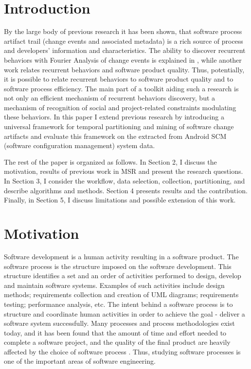 \documentclass[conference]{IEEEtran}
\begin{document}
\section{Introduction}
By the large body of previous research it has been shown, that software
process artifact trail (change events and associated metadata) is a rich 
source of process and developers' information and characteristics. 
The ability to discover recurrent behaviors with Fourier Analysis 
of change events is explained in \cite{citeulike:10377345}, while another work
\cite{citeulike:10392277} relates recurrent behaviors and software product quality.
Thus, potentially, it is possible to relate recurrent behaviors to software product 
quality and to software process efficiency. 
The main part of a toolkit aiding such a research is not only an efficient 
mechanism of recurrent behaviors discovery, but a mechanism of recognition of 
social and project-related constraints modulating these behaviors.
In this paper I extend previous research by introducing a universal 
framework for temporal partitioning and mining of software change 
artifacts and evaluate this framework on the extracted from Android 
SCM (software configuration management) system data. 

The rest of the paper is organized as follows. 
In Section 2, I discuss the motivation, results of previous work in MSR and present 
the research questions. 
In Section 3, I consider the workflow, data selection, collection, partitioning, 
and describe algorithms and methods. Section 4 presents results and the contribution.
Finally, in Section 5, I discuss limitations and possible extension of this work.

\section{Motivation}
Software development is a human activity resulting in a software product. 
The software process is the structure imposed on the software development. 
This structure identifies a set and an order of activities performed to design, 
develop and maintain software systems. Examples of such activities 
include design methods; requirements collection and creation of UML diagrams; 
requirements testing; performance analysis, etc. The intent behind a software 
process is to structure and coordinate human activities in order to achieve the goal - 
deliver a software system successfully. Many processes and process methodologies 
exist today, and it has been found that the amount of time and effort needed to 
complete a software project, and the quality of the final product are heavily 
affected by the choice of software process \cite{citeulike:9919804}. 
Thus, studying software processes is one of the important areas of software engineering. 
\end{document}

